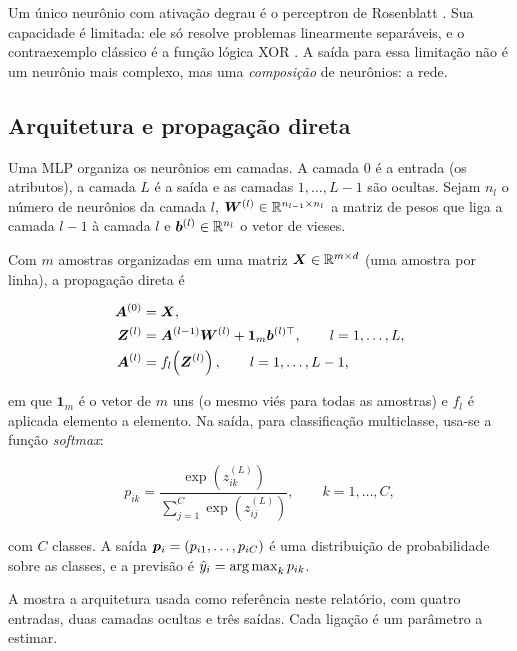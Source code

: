 Um único neurônio com ativação degrau é o perceptron de Rosenblatt \cite{rosenblatt1958}. Sua
capacidade é limitada: ele só resolve problemas linearmente separáveis, e o contraexemplo clássico
é a função lógica XOR \cite{minsky1969}. A saída para essa limitação não é um neurônio mais
complexo, mas uma \emph{composição} de neurônios: a rede.

\subsection{Arquitetura e propagação direta}

Uma MLP organiza os neurônios em camadas. A camada $0$ é a entrada (os atributos), a camada $L$ é a
saída e as camadas $1,\dots,L-1$ são ocultas. Sejam $n_l$ o número de neurônios da camada $l$,
$\bm{W}^{(l)} \in \mathbb{R}^{n_{l-1}\times n_l}$ a matriz de pesos que liga a camada $l-1$ à camada $l$ e
$\bm{b}^{(l)} \in \mathbb{R}^{n_l}$ o vetor de vieses.

Com $m$ amostras organizadas em uma matriz $\bm{X} \in \mathbb{R}^{m\times d}$ (uma amostra por linha), a
propagação direta é

\begin{align}
	\bm{A}^{(0)} &= \bm{X}, \label{eq:forward-a0}\\
	\bm{Z}^{(l)} &= \bm{A}^{(l-1)} \bm{W}^{(l)} + \mathbf{1}_m \bm{b}^{(l)\top},
	\qquad l = 1,\dots,L, \label{eq:forward-z}\\
	\bm{A}^{(l)} &= f_l\!\left(\bm{Z}^{(l)}\right),
	\qquad l = 1,\dots,L-1, \label{eq:forward-a}
\end{align}

em que $\mathbf{1}_m$ é o vetor de $m$ uns (o mesmo viés para todas as amostras) e $f_l$ é aplicada
elemento a elemento. Na saída, para classificação multiclasse, usa-se a função \emph{softmax}:

\begin{equation}
	p_{ik} = \frac{\exp\!\left(z_{ik}^{(L)}\right)}{\displaystyle\sum_{j=1}^{C}\exp\!\left(z_{ij}^{(L)}\right)},
	\qquad k = 1,\dots,C,
	\label{eq:softmax}
\end{equation}

com $C$ classes. A saída $\bm{p}_i = (p_{i1},\dots,p_{iC})$ é uma distribuição de probabilidade sobre
as classes, e a previsão é $\hat{y}_i = \operatorname*{arg\,max}_k p_{ik}$.

A  mostra a arquitetura usada como referência neste relatório, com quatro
entradas, duas camadas ocultas e três saídas. Cada ligação é um parâmetro a estimar.

